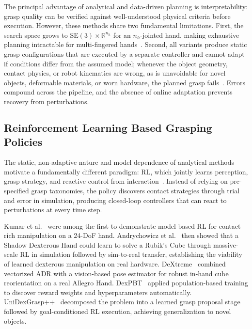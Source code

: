 The principal advantage of analytical and data-driven planning is interpretability: grasp quality can be verified against well-understood physical criteria before execution.
However, these methods share two fundamental limitations.
First, the search space grows to $\mathrm{SE}(3) \times \mathbb{R}^{n_h}$ for an $n_h$-jointed hand, making exhaustive planning intractable for multi-fingered hands~\cite{Bicchi2000}.
Second, all variants produce static grasp configurations that are executed by a separate controller and cannot adapt if conditions differ from the assumed model; whenever the object geometry, contact physics, or robot kinematics are wrong, as is unavoidable for novel objects, deformable materials, or worn hardware, the planned grasp fails~\cite{Tang2024}.
Errors compound across the pipeline, and the absence of online adaptation prevents recovery from perturbations.

\subsection{Reinforcement Learning Based Grasping Policies}%
\label{subsec:learning_based_grasping}%

The static, non-adaptive nature and model dependence of analytical methods motivate a fundamentally different paradigm: \ac{RL}, which jointly learns perception, grasp strategy, and reactive control from interaction~\cite{Tang2024}.
Instead of relying on pre-specified grasp taxonomies, the policy discovers contact strategies through trial and error in simulation, producing closed-loop controllers that can react to perturbations at every time step.

Kumar et al.~\cite{Kumar2016} were among the first to demonstrate model-based \ac{RL} for contact-rich manipulation on a 24-\acs{DoF} hand.
Andrychowicz et al.~\cite{Andrychowicz2020} then showed that a Shadow Dexterous Hand could learn to solve a Rubik's Cube through massive-scale \ac{RL} in simulation followed by sim-to-real transfer, establishing the viability of learned dexterous manipulation on real hardware.
DeXtreme~\cite{Handa2024} combined vectorized \ac{ADR} with a vision-based pose estimator for robust in-hand cube reorientation on a real Allegro Hand.
DexPBT~\cite{Petrenko2023} applied population-based training to discover reward weights and hyperparameters automatically.
UniDexGrasp++~\cite{Wan2023} decomposed the problem into a learned grasp proposal stage followed by goal-conditioned \ac{RL} execution, achieving generalization to novel objects.

